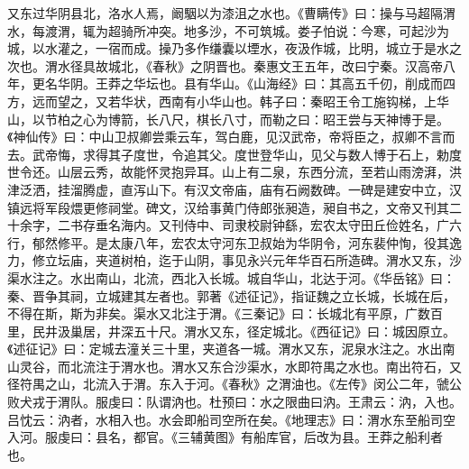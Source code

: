 \documentclass[12pt,UTF8]{ctexbook}
\begin{document}
又东过华阴县北，洛水人焉，阚駰以为漆沮之水也。《曹瞒传》曰：操与马超隔渭水，每渡渭，辄为超骑所冲突。地多沙，不可筑城。娄子怕说：今寒，可起沙为城，以水灌之，一宿而成。操乃多作缣囊以堙水，夜汲作城，比明，城立于是水之次也。渭水径具故城北，《春秋》之阴晋也。秦惠文王五年，改曰宁秦。汉高帝八年，更名华阴。王莽之华坛也。县有华山。《山海经》曰：其高五千仞，削成而四方，远而望之，又若华状，西南有小华山也。韩子曰：秦昭王令工施钩梯，上华山，以节柏之心为博箭，长八尺，棋长八寸，而勒之曰：昭王尝与天神博于是。《神仙传》曰：中山卫叔卿尝乘云车，驾白鹿，见汉武帝，帝将臣之，叔卿不言而去。武帝悔，求得其子度世，令追其父。度世登华山，见父与数人博于石上，勅度世令还。山层云秀，故能怀灵抱异耳。山上有二泉，东西分流，至若山雨滂湃，洪津泛洒，挂溜腾虚，直泻山下。有汉文帝庙，庙有石阙数碑。一碑是建安中立，汉镇远将军段煨更修祠堂。碑文，汉给事黄门侍郎张昶造，昶自书之，文帝又刊其二十余字，二书存垂名海内。又刊侍中、司隶校尉钟繇，宏农太守田丘俭姓名，广六行，郁然修平。是太康八年，宏农太守河东卫叔始为华阴令，河东裴仲恂，役其逸力，修立坛庙，夹道树柏，迄于山阴，事见永兴元年华百石所造碑。渭水又东，沙渠水注之。水出南山，北流，西北入长城。城自华山，北达于河。《华岳铭》曰：秦、晋争其祠，立城建其左者也。郭著《述征记》，指证魏之立长城，长城在后，不得在斯，斯为非矣。渠水又北注于渭。《三秦记》曰：长城北有平原，广数百里，民井汲巢居，井深五十尺。渭水又东，径定城北。《西征记》曰：城因原立。《述征记》曰：定城去潼关三十里，夹道各一城。渭水又东，泥泉水注之。水出南山灵谷，而北流注于渭水也。渭水又东合沙渠水，水即符禺之水也。南出符石，又径符禺之山，北流入于渭。东入于河。《春秋》之渭油也。《左传》闵公二年，虢公败犬戎于渭队。服虔曰：队谓汭也。杜预曰：水之限曲曰汭。王肃云：汭，入也。吕忱云：汭者，水相入也。水会即船司空所在矣。《地理志》曰：渭水东至船司空入河。服虔曰：县名，都官。《三辅黄图》有船库官，后改为县。王莽之船利者也。
\end{document}
